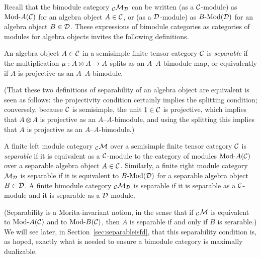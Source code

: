 \documentclass{amsart}
\begin{document}
Recall that the bimodule category ${}_\mathcal C \mathcal M_\mathcal D$ can be written (as a $\mathcal C$-module) as $\Mod{}{A}(\cC)$ for an algebra object $A \in \mathcal C$, or (as a $\mathcal D$-module) as $\Mod{B}{}(\cD)$ for an algebra object $B \in \mathcal D$.  These expressions of bimodule categories as categories of modules for algebra objects invites the following definitions.
\begin{definition}
An algebra object $A \in \mathcal C$ in a semisimple finite tensor category $\mathcal C$ is \emph{separable} if the multiplication $\mu: A \otimes A \rightarrow A$ splits as an $A$--$A$-bimodule map, or equivalently if $A$ is projective as an $A$--$A$-bimodule.
\end{definition}
\noindent (That these two definitions of separability of an algebra object are equivalent is seen as follows: the projectivity condition certainly implies the splitting condition; conversely, because $\mathcal C$ is semisimple, the unit $1 \in \mathcal C$ is projective, which implies that $A \otimes A$ is projective as an $A$--$A$-bimodule, and using the splitting this implies that $A$ is projective as an $A$--$A$-bimodule.)
\begin{definition}
A finite left module category ${}_\mathcal C \mathcal M$ over a semisimple finite tensor category $\mathcal C$ is \emph{separable} if it is equivalent as a $\mathcal C$-module to the category of modules $\Mod{}{A}(\cC)$ over a separable algebra object $A \in \mathcal C$.  Similarly, a finite right module category $\mathcal M_\mathcal D$ is separable if it is equivalent to $\Mod{B}{}(\cD)$ for a separable algebra object $B \in \mathcal D$.  A finite bimodule category ${}_\mathcal C \mathcal M_\mathcal D$ is separable if it is separable as a $\mathcal C$-module and it is separable as a $\mathcal D$-module.
\end{definition}
\noindent (Separability is a Morita-invariant notion, in the sense that if ${}_\mathcal C \mathcal M$ is equivalent to $\Mod{}{A}(\cC)$ and to $\Mod{}{B}(\cC)$, then $A$ is separable if and only if $B$ is serarable.)  We will see later, in Section~\ref{sec:separableisfd}, that this separability condition is, as hoped, exactly what is needed to ensure a bimodule category is maximally dualizable.  
\end{document}
